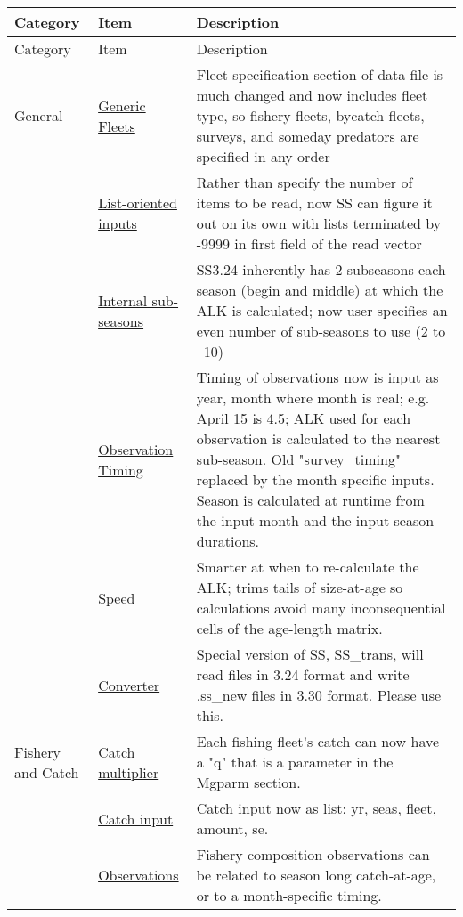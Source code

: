		\begin{center}
			\begin{longtable}{p{2cm} p{3cm} p{10cm}}
				Category & Item & Description\\
				\hline
				\endfirsthead
		
				Category & Item & Description\\
				\hline
				\endhead
		
				\hline
				\endfoot
		
				\endlastfoot
				
				General & \hyperlink{GenericFleet}{Generic Fleets} & Fleet specification section of data file is much changed and now includes fleet type, so fishery fleets, bycatch fleets, surveys, and someday predators are specified in any order\\
				        & \hyperlink{ListBased}{List-oriented inputs} & Rather than specify the number of items to be read, now SS can figure it out on its own with lists terminated by -9999 in first field of the read vector \\
				        & \hyperlink{SubSeas}{Internal sub-seasons} & SS3.24 inherently has 2 subseasons each season (begin and middle) at which the ALK is calculated; now user specifies an even number of sub-seasons to use (2 to ~10) \\
				        & \hyperlink{ObsTiming}{Observation Timing} & Timing of observations now is input as year, month where month is real; e.g. April 15 is 4.5; ALK used for each observation is calculated to the nearest sub-season.  Old "survey\_timing" replaced by the month specific inputs.  Season is calculated at runtime from the input month and the input season durations. \\
				        & Speed & Smarter at when to re-calculate the ALK; trims tails of size-at-age so calculations avoid many inconsequential cells of the age-length matrix. \\
				        & \hyperlink{Convert} {Converter} & Special version of SS, SS\_trans, will read files in 3.24 format and write .ss\_new files in 3.30 format.  Please use this.\\
				Fishery and Catch & \hyperlink{CatchMult}{Catch multiplier} & Each fishing fleet's catch can now have a "q" that is a parameter in the Mgparm section.\\
						& \hyperlink{CatchFormat}{Catch input} & Catch input now as list:  yr, seas, fleet, amount, se. \\
						& \hyperlink{CompTiming}{Observations} & Fishery composition observations can be related to season long catch-at-age, or to a month-specific timing.\\

\end{longtable}
\end{center}
